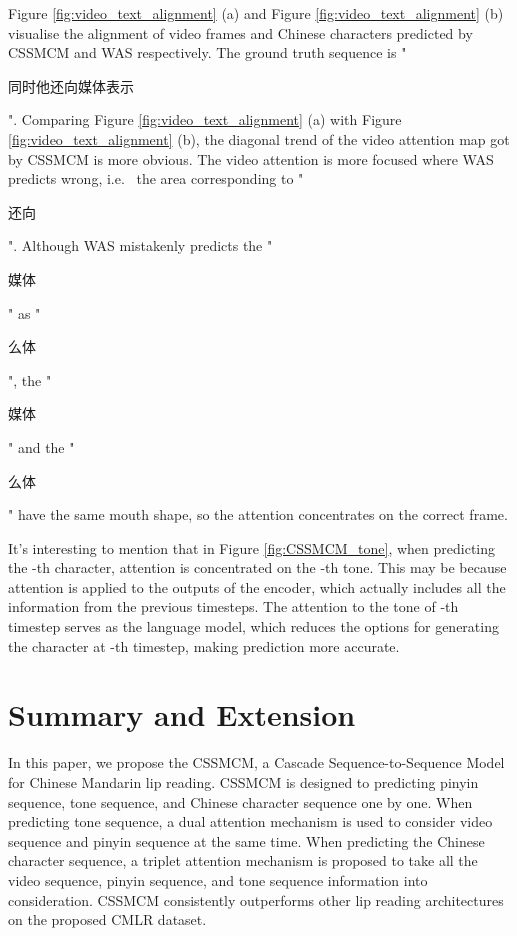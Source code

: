 \documentclass[sigconf]{acmart}
\begin{document}
Figure \ref{fig:video_text_alignment} (a) and Figure \ref{fig:video_text_alignment} (b) visualise the alignment of video frames and Chinese characters predicted by CSSMCM and WAS respectively. The ground truth sequence is "\begin{CJK*}{UTF8}{gbsn}同时他还向媒体表示\end{CJK*}". Comparing Figure \ref{fig:video_text_alignment} (a) with Figure \ref{fig:video_text_alignment} (b), the diagonal trend of the video attention map got by CSSMCM is more obvious. The video attention is more focused where WAS predicts wrong, i.e. \ the area corresponding to "\begin{CJK*}{UTF8}{gbsn}还向\end{CJK*}". Although WAS mistakenly predicts the "\begin{CJK*}{UTF8}{gbsn}媒体\end{CJK*}" as "\begin{CJK*}{UTF8}{gbsn}么体\end{CJK*}", the "\begin{CJK*}{UTF8}{gbsn}媒体\end{CJK*}" and the "\begin{CJK*}{UTF8}{gbsn}么体\end{CJK*}" have the same mouth shape, so the attention concentrates on the correct frame.

It's interesting to mention that in Figure \ref{fig:CSSMCM_tone}, when predicting the -th character, attention is concentrated on the -th tone. This may be because attention is applied to the outputs of the encoder, which actually includes all the information from the previous  timesteps. The attention to the tone of -th timestep serves as the language model, which reduces the options for generating the character at -th timestep, making prediction more accurate.


\section{Summary and Extension}
In this paper, we propose the CSSMCM, a Cascade Sequence-to-Sequence Model for Chinese Mandarin lip reading. CSSMCM is designed to predicting pinyin sequence, tone sequence, and Chinese character sequence one by one. When predicting tone sequence, a dual attention mechanism is used to consider video sequence and pinyin sequence at the same time. When predicting the Chinese character sequence, a triplet attention mechanism is proposed to take all the video sequence, pinyin sequence, and tone sequence information into consideration. CSSMCM consistently outperforms other lip reading architectures on the proposed CMLR dataset. 
\end{document}
